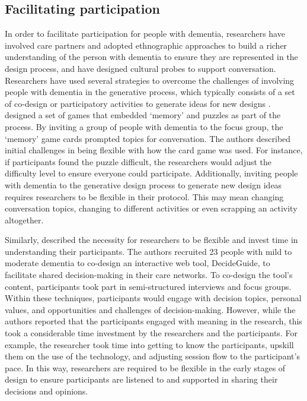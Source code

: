 \subsection{Facilitating participation}
\label{BL:SupportParticipation}
In order to facilitate participation for people with dementia, researchers have involved care partners and adopted ethnographic approaches to build a richer understanding of the person with dementia to ensure they are represented in the design process, and have designed cultural probes to support conversation. Researchers have used several strategies to overcome the challenges of involving people with dementia in the generative process, which typically consists of a set of co-design or participatory activities to generate ideas for new designs \citep{suijkerbuijk_active_2019}. \cite{mayer2013lessons} designed a set of games that embedded `memory' and puzzles as part of the process. By inviting a group of people with dementia to the focus group, the `memory' game cards prompted topics for conversation. The authors described initial challenges in being flexible with how the card game was used. For instance, if participants found the puzzle difficult, the researchers would adjust the difficulty level to ensure everyone could participate. Additionally, inviting people with dementia to the generative design process to generate new design ideas requires researchers to be flexible in their protocol. This may mean changing conversation topics, changing to different activities or even scrapping an activity altogether.

Similarly, \cite{span2015interactive} described the necessity for researchers to be flexible and invest time in understanding their participants. The authors recruited 23 people with mild to moderate dementia to co-design an interactive web tool, DecideGuide, to facilitate shared decision-making in their care networks. To co-design the tool's content, participants took part in semi-structured interviews and focus groups. Within these techniques, participants would engage with decision topics, personal values, and opportunities and challenges of decision-making. However, while the authors reported that the participants engaged with meaning in the research, this took a considerable time investment by the researchers and the participants. For example, the researcher took time into getting to know the participants, upskill them on the use of the technology, and adjusting session flow to the participant's pace. In this way, researchers are required to be flexible in the early stages of design to ensure participants are listened to and supported in sharing their decisions and opinions.

